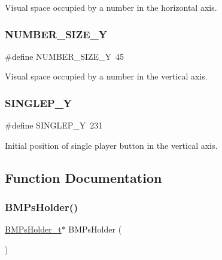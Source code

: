 Visual space occupied by a number in the horizontal axis. 

\hypertarget{group___b_m_ps_holder_gad70760092071deb462db0dc776795028}{}\label{group___b_m_ps_holder_gad70760092071deb462db0dc776795028} 
\subsubsection{\texorpdfstring{N\+U\+M\+B\+E\+R\+\_\+\+S\+I\+Z\+E\+\_\+Y}{NUMBER\_SIZE\_Y}}
{\footnotesize\ttfamily \#define N\+U\+M\+B\+E\+R\+\_\+\+S\+I\+Z\+E\+\_\+Y~45}



Visual space occupied by a number in the vertical axis. 

\hypertarget{group___b_m_ps_holder_ga19da38bd34116364d23ed824fbede542}{}\label{group___b_m_ps_holder_ga19da38bd34116364d23ed824fbede542} 
\subsubsection{\texorpdfstring{S\+I\+N\+G\+L\+E\+P\+\_\+Y}{SINGLEP\_Y}}
{\footnotesize\ttfamily \#define S\+I\+N\+G\+L\+E\+P\+\_\+Y~231}



Initial position of single player button in the vertical axis. 



\subsection{Function Documentation}
\hypertarget{group___b_m_ps_holder_gafd662085ea52a83586cddd30b6423c01}{}\label{group___b_m_ps_holder_gafd662085ea52a83586cddd30b6423c01} 
\subsubsection{\texorpdfstring{B\+M\+Ps\+Holder()}{BMPsHolder()}}
{\footnotesize\ttfamily \hyperlink{struct_b_m_ps_holder__t}{B\+M\+Ps\+Holder\+\_\+t}$\ast$ B\+M\+Ps\+Holder (\begin{DoxyParamCaption}{ }\end{DoxyParamCaption})}


